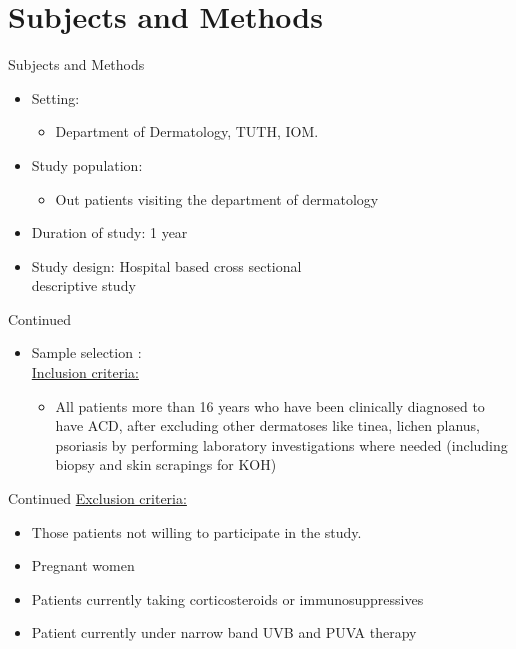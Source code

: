 \documentclass[11pt]{beamer}
\begin{document}
\section{Subjects and Methods}
\begin{frame}{Subjects and Methods}
\begin{itemize}
\item Setting:
\begin{itemize}
\item Department of Dermatology, TUTH, IOM.

\end{itemize}
\item Study population:
\begin{itemize}
\item Out patients visiting the department of dermatology

\end{itemize}
\item Duration of study: 1 year
\item Study design: Hospital based cross sectional \\ descriptive study

\end{itemize}
\end{frame}

\begin{frame}{Continued}
\begin{itemize}

\item Sample selection :\\[5pt]
\ul{Inclusion criteria:}
\begin{itemize}
\item All patients  more than 16 years who have been clinically diagnosed to have ACD,  after excluding other dermatoses like tinea, lichen planus, psoriasis by performing laboratory investigations where needed (including biopsy and skin scrapings for KOH)

\end{itemize}

\end{itemize}
\end{frame}

\begin{frame}{Continued}
\ul{Exclusion criteria:}
\begin{itemize}
\item Those patients not willing to participate in the study.
\item Pregnant women
\item Patients currently taking corticosteroids or immunosuppressives
\item Patient currently under narrow band UVB and PUVA therapy

\end{itemize}
\end{frame}
\end{document}
